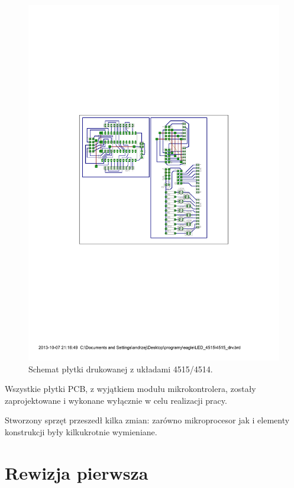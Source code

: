 \begin{figure}
  \centering
  \includegraphics{gfx/4515_drvpcb}
  \caption{Schemat płytki drukowanej z układami 4515/4514.}
  \label{fig:4515_pcb}
\end{figure}

Wszystkie płytki PCB, z wyjątkiem modułu mikrokontrolera, zostały zaprojektowane i wykonane wyłącznie w celu realizacji pracy.

Stworzony sprzęt przeszedł kilka zmian: zarówno mikroprocesor jak i elementy konstrukcji były kilkukrotnie wymieniane.\\

\section{Rewizja pierwsza}

